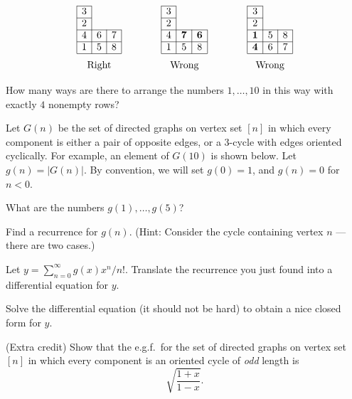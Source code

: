 \[
\begin{array}{|c|c|c|}
\cline{1-1}
3\\\cline{1-1}
2\\\cline{1-3}
4&6&7\\\cline{1-3}
1&5&8\\\hline
\multicolumn{3}{c}{\text{\pad Right}}
\end{array}
\qquad\qquad
\begin{array}{|c|c|c|}
\cline{1-1}
3\\\cline{1-1}
2\\\cline{1-3}
4&{\bf7}&{\bf6}\\\cline{1-3}
1&5&8\\\hline
\multicolumn{3}{c}{\pad\text{Wrong}}
\end{array}
\qquad\qquad
\begin{array}{|c|c|c|}
\cline{1-1}
3\\\cline{1-1}
2\\\cline{1-3}
{\bf1}&5&8\\\cline{1-3}
{\bf4}&6&7\\\hline
\multicolumn{3}{c}{\pad\text{Wrong}}
\end{array}
\]
How many ways are there to arrange the numbers $1,\dots,10$ in this way with exactly $4$ nonempty rows?

\prob Let $G(n)$ be the set of directed graphs on vertex set $[n]$ in which every component is either a pair of opposite edges, or a 3-cycle with edges oriented cyclically.  For example, an element of $G(10)$ is shown below.
Let $g(n)=|G(n)|$.  By convention, we will set $g(0)=1$, and $g(n)=0$ for $n<0$.

 What are the numbers $g(1),\dots,g(5)$?

 Find a recurrence for $g(n)$.  (Hint: Consider the cycle containing vertex $n$ --- there are two cases.)

 Let $y=\sum_{n=0}^\infty g(x) x^n/n!$.
Translate the recurrence you just found into a differential equation for $y$.

 Solve the differential equation (it should not be hard) to obtain a nice closed form for $y$.

\probpart (Extra credit) Show that the e.g.f.\ for the set of directed graphs on vertex set $[n]$ in which every component is an oriented cycle of \emph{odd} length is
\[\sqrt{\frac{1+x}{1-x}}.\]

